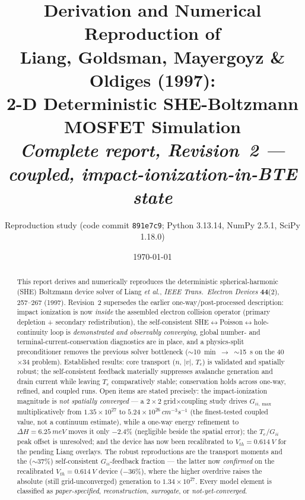 \documentclass[11pt]{article}
\title{\textbf{Derivation and Numerical Reproduction of\\
Liang, Goldsman, Mayergoyz \& Oldiges (1997):\\
2-D Deterministic SHE-Boltzmann MOSFET Simulation}\\[5pt]
\large\textit{Complete report, Revision~2 --- coupled, impact-ionization-in-BTE state}}
\author{Reproduction study \quad\small(code commit \texttt{891e7c9}; Python 3.13.14, NumPy 2.5.1, SciPy 1.18.0)}
\date{\today}
\begin{document}
\maketitle

\begin{abstract}
\noindent
This report derives and numerically reproduces the deterministic spherical-harmonic (SHE)
Boltzmann device solver of Liang \emph{et al.}, \emph{IEEE Trans.\ Electron Devices}
\textbf{44}(2), 257--267 (1997). Revision~2 supersedes the earlier one-way/post-processed
description: impact ionization is now \emph{inside} the assembled electron collision operator
(primary depletion + secondary redistribution), the self-consistent
SHE$\leftrightarrow$Poisson$\leftrightarrow$hole-continuity loop is \emph{demonstrated and
observably converging}, global number- and terminal-current-conservation diagnostics are in
place, and a physics-split preconditioner removes the previous solver bottleneck
($\sim$10~min~$\to$~$\sim$15~s on the 40$\times$34 problem). Established results: core
transport ($n$, $|v|$, $T_e$) is validated and spatially robust; the self-consistent feedback
materially suppresses avalanche generation and drain current while leaving $T_e$ comparatively
stable; conservation holds across one-way, refined, and coupled runs. Open items are stated
precisely: the impact-ionization magnitude is \emph{not spatially converged} --- a
$2\times2$ grid$\times$coupling study drives $G_{ii,\max}$ multiplicatively from
$1.35\times10^{27}$ to $5.24\times10^{26}\,\si{cm^{-3}s^{-1}}$ (the finest-tested coupled value,
not a continuum estimate), while a one-way energy refinement to $\Delta H=\SI{6.25}{meV}$ moves it
only $-2.4\%$ (negligible beside the spatial error); the $T_e$/$G_{ii}$ peak offset is unresolved;
and the device has now been recalibrated to $V_{th}=\SI{0.614}{V}$ for the pending Liang overlays.
The robust reproductions are the transport moments and the ($\sim$37\%) self-consistent
$G_{ii}$-feedback fraction --- the latter now \emph{confirmed} on the recalibrated
$V_{th}=\SI{0.614}{V}$ device ($-36\%$), where the higher overdrive raises the absolute
(still grid-unconverged) generation to $1.34\times10^{27}$. Every model element is classified as \emph{paper-specified},
\emph{reconstruction}, \emph{surrogate}, or \emph{not-yet-converged}.
\end{abstract}

\tableofcontents
\end{document}
